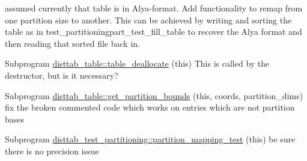 \begin{DoxyRefList}
assumed currently that table is in Alya-\/format. Add functionality to remap from one partition size to another. This can be achieved by writing and sorting the table as in test\+\_\+partitioningpart\+\_\+test\+\_\+fill\+\_\+table to recover the Alya format and then reading that sorted file back in.  
\item[Subprogram \mbox{\hyperlink{namespacedisttab__table_aa09b941e14a6f94cd56d6531a3abc1cf}{disttab\+\_\+table\+::table\+\_\+deallocate}} (this)]\label{todo__todo000006}%
%
This is called by the destructor, but is it necessary?  
\item[Subprogram \mbox{\hyperlink{namespacedisttab__table_afe75e53b5186b175b6e164ef565a5d7e}{disttab\+\_\+table\+::get\+\_\+partition\+\_\+bounds}} (this, coords, partition\+\_\+dims)]\label{todo__todo000007}%
%
fix the broken commented code which works on entries which are not partition bases  
\item[Subprogram \mbox{\hyperlink{namespacedisttab__test__partitioning_a5a71fcde2c7b22ebfad7d1ce5b142407}{disttab\+\_\+test\+\_\+partitioning\+::partition\+\_\+mapping\+\_\+test}} (this)]\label{todo__todo000008}%
%
be sure there is no precision issue 
\end{DoxyRefList}